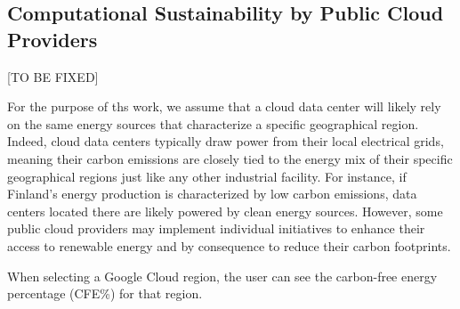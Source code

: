 
\subsection{Computational Sustainability by Public Cloud Providers}

[TO BE FIXED] \newline

For the purpose of ths work, we assume that a cloud data center will likely rely on the same energy sources that characterize a specific geographical region.
Indeed, cloud data centers typically draw power from their local electrical grids, meaning their carbon emissions are closely tied to the energy mix of their specific geographical regions just like any other industrial facility.
For instance, if Finland's energy production is characterized by low carbon emissions, data centers located there are likely powered by clean energy sources. 
However, some public cloud providers may implement individual initiatives to enhance their access to renewable energy and by consequence to reduce their carbon footprints.
 




When selecting a Google Cloud region, the user can see the carbon-free energy percentage (CFE\%) for that region.


